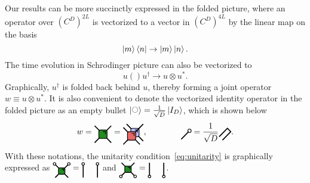 \documentclass[aps,prx,twocolumn,notitlepage,nofootinbib,nobalancelastpage]{revtex4-2}
\theoremstyle{break}
\newcommand{\1}{\mathbbm{1}}
\theoremstyle{plain}
\theoremstyle{plain}
\theoremstyle{plain}
\newcommand{\Wgatered}[2]{
\draw[very thick] (#1-0.5, #2 +0.5) -- (#1+0.5,#2-0.5);
\draw[very thick] (#1-0.5,#2-0.5) -- (#1+0.5,#2+0.5);
\draw[ thick, fill=myred, rounded corners=2pt] (#1-0.25,#2+0.25) rectangle (#1+0.25,#2-0.25);
\draw[thick] (#1,#2+0.15) -- (#1+0.15,#2+0.15) -- (#1+0.15,#2);
}
\newcommand{\Wgateblue}[2]{
\draw[very thick] (#1-0.5, #2 +0.5) -- (#1+0.5,#2-0.5);
\draw[very thick] (#1-0.5,#2-0.5) -- (#1+0.5,#2+0.5);
\draw[ thick, fill=myblue, rounded corners=2pt] (#1-0.25,#2+0.25) rectangle (#1+0.25,#2-0.25);
\draw[thick] (#1,#2+0.15) -- (#1+0.15,#2+0.15) -- (#1+0.15,#2);
}
\newcommand{\Wgategreen}[2]{
\draw[very thick] (#1-0.5, #2 +0.5) -- (#1+0.5,#2-0.5);
\draw[very thick] (#1-0.5,#2-0.5) -- (#1+0.5,#2+0.5);
\draw[ thick, fill=mygreen, rounded corners=2pt] (#1-0.25,#2+0.25) rectangle (#1+0.25,#2-0.25);
\draw[thick] (#1,#2+0.15) -- (#1+0.15,#2+0.15) -- (#1+0.15,#2);
}
\newcommand{\MYcircle}[2]{
\draw[thick, fill=white] (#1,#2) circle (0.1cm); }
\newcommand{\mcirc}{\mathbin{\scalerel*{\fullmoon}{G}}}
\newcommand{\pk}[1]{{\color{blue}[#1]}}
\begin{document}
Our results can be more succinctly expressed in the folded picture, where an operator over $(C^D)^{2L}$ is vectorized to a vector in $(C^D)^{4L}$ by the linear map on the basis
\begin{equation}
\ket{m}\bra{n}\to\ket{m}\ket{n}.
\end{equation}
The time evolution in Schrodinger picture can also be vectorized to
\begin{equation}
u()u^{\dagger}\to u\otimes u^*.
\end{equation}
Graphically, $u^{\dagger}$
is folded back behind $u$, thereby forming a joint operator $w 	\equiv u\otimes u^{*}$.
It is also convenient to denote the vectorized identity operator in the folded picture as an empty bullet $\ket{\mcirc}=\frac{1}{\sqrt{D}}\ket{I_D}$, which is shown below %
\begin{equation}
w=\begin{tikzpicture}[baseline=(current  bounding  box.center), scale=0.7]
\Wgategreen{0}{0}
\end{tikzpicture}
=
\begin{tikzpicture}[baseline=(current  bounding  box.center), scale=0.7]
\Wgateblue{0.1}{0.1}
\Wgatered{-0.1}{-0.1}
\end{tikzpicture}
,
\qquad
\qquad
\begin{tikzpicture}[baseline=(current  bounding  box.center), scale=0.7]
\MYcircle{0.25}{0.25}
\draw[very thick] (-0.25,-0.25)--(0.20,0.20);
\end{tikzpicture}
=\frac{1}{\sqrt{D}}
\begin{tikzpicture}[baseline=(current  bounding  box.center), scale=0.7]
\draw[very thick] (-0.25,-0.25)--(0.25,0.25)--(0.05,0.45)--(-0.45,-0.05);
\end{tikzpicture}
.
\end{equation} 
With these notations, the unitarity condition~\eqref{eq:unitarity} is graphically expressed as $
\begin{tikzpicture}[baseline=(current  bounding  box.center), scale=0.55]
\Wgategreen{0}{0}
\MYcircle{0.55}{0.55}
\MYcircle{-0.55}{0.55}
\end{tikzpicture}
=
\begin{tikzpicture}[baseline=(current  bounding  box.center), scale=0.55]
\draw[very thick] (-0.55,-0.5) -- (-0.55,0.5);
\draw[very thick] (0.55,-0.5) -- (0.55,0.5);
\MYcircle{0.55}{0.55}
\MYcircle{-0.55}{0.55}
\end{tikzpicture}
$ and $
\begin{tikzpicture}[baseline=(current  bounding  box.center), scale=0.55]
\Wgategreen{0}{0}
\MYcircle{0.55}{-0.55}
\MYcircle{-0.55}{-0.55}
\end{tikzpicture}
=
\begin{tikzpicture}[baseline=(current  bounding  box.center), scale=0.55]
\MYcircle{0.55}{-0.55}
\MYcircle{-0.55}{-0.55}
\draw[very thick] (-0.55,-0.5) -- (-0.55,0.5);
\draw[very thick] (0.55,-0.5) -- (0.55,0.5);
\end{tikzpicture}
$.
\end{document}
